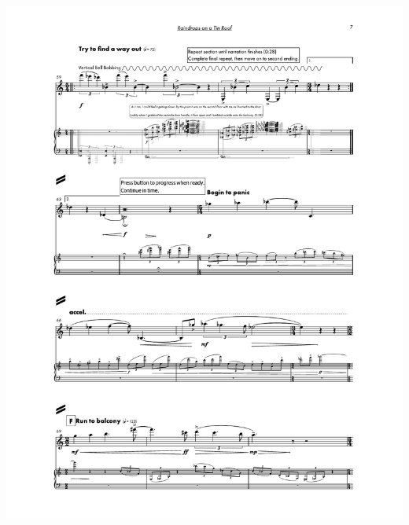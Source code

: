 \begin{center}
     \includegraphics[scale=0.75]{Scores/raindrops_Part13.pdf}
\end{center}
\newpage
